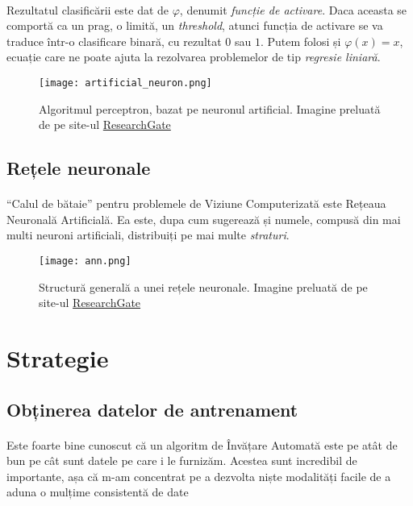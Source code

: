 \paragraph{}
Rezultatul clasificării este dat de $\varphi$, denumit \emph{funcție de activare}.
Daca aceasta se comportă ca un prag, o limită, un \emph{threshold}, atunci funcția de activare se va traduce într-o clasificare binară, cu rezultat $0$ sau $1$.
Putem folosi și $\varphi(x) = x$, ecuație care ne poate ajuta la rezolvarea problemelor de tip \emph{regresie liniară}.

\begin{figure}[h]
    \centering
    \texttt{[image: artificial\_neuron.png]}
    \caption{Algoritmul perceptron, bazat pe neuronul artificial. Imagine preluată de pe site-ul \href{https://www.researchgate.net/figure/Scheme-of-a-perceptron-A-nonlinear-activation-function-BULLET-is-applied-to-the_fig3_315788933}{ResearchGate}}
\end{figure}


\subsection{Rețele neuronale}
\paragraph{}
``Calul de bătaie'' pentru problemele de Viziune Computerizată este Rețeaua Neuronală Artificială.
Ea este, dupa cum sugerează și numele, compusă din mai multi neuroni artificiali, distribuiți pe mai multe \emph{straturi}.

\begin{figure}[h]
    \centering
    \texttt{[image: ann.png]}
    \caption{Structură generală a unei rețele neuronale. Imagine preluată de pe site-ul \href{https://www.researchgate.net/figure/Deep-learning-diagram_fig5_323784695}{ResearchGate}}
\end{figure}

\section{Strategie}

\subsection{Obținerea datelor de antrenament}
\paragraph{}
Este foarte bine cunoscut că un algoritm de Învățare Automată este pe atât de bun pe cât sunt datele pe care i le furnizăm.
Acestea sunt incredibil de importante, așa că m-am concentrat pe a dezvolta niște modalități facile de a aduna o mulțime consistentă de date

